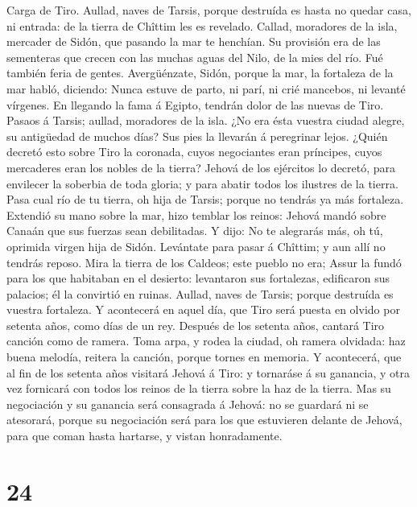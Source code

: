  Carga de Tiro. Aullad, naves de Tarsis, porque destruída
es hasta no quedar casa, ni entrada: de la tierra de Chîttim les es
revelado.  Callad, moradores de la isla, mercader de
Sidón, que pasando la mar te henchían.  Su provisión era
de las sementeras que crecen con las muchas aguas del Nilo, de la mies
del río. Fué también feria de gentes.  Avergüénzate,
Sidón, porque la mar, la fortaleza de la mar habló, diciendo: Nunca
estuve de parto, ni parí, ni crié mancebos, ni levanté vírgenes.
 En llegando la fama á Egipto, tendrán dolor de las nuevas
de Tiro.  Pasaos á Tarsis; aullad, moradores de la isla.
 ¿No era ésta vuestra ciudad alegre, su antigüedad de
muchos días? Sus pies la llevarán á peregrinar lejos. 
¿Quién decretó esto sobre Tiro la coronada, cuyos negociantes eran
príncipes, cuyos mercaderes eran los nobles de la tierra? 
Jehová de los ejércitos lo decretó, para envilecer la soberbia de toda
gloria; y para abatir todos los ilustres de la tierra. 
Pasa cual río de tu tierra, oh hija de Tarsis; porque no tendrás ya más
fortaleza.  Extendió su mano sobre la mar, hizo temblar
los reinos: Jehová mandó sobre Canaán que sus fuerzas sean debilitadas.
 Y dijo: No te alegrarás más, oh tú, oprimida virgen hija
de Sidón. Levántate para pasar á Chîttim; y aun allí no tendrás reposo.
 Mira la tierra de los Caldeos; este pueblo no era; Assur
la fundó para los que habitaban en el desierto: levantaron sus
fortalezas, edificaron sus palacios; él la convirtió en ruinas.
 Aullad, naves de Tarsis; porque destruída es vuestra
fortaleza.  Y acontecerá en aquel día, que Tiro será
puesta en olvido por setenta años, como días de un rey. Después de los
setenta años, cantará Tiro canción como de ramera.  Toma
arpa, y rodea la ciudad, oh ramera olvidada: haz buena melodía, reitera
la canción, porque tornes en memoria.  Y acontecerá, que
al fin de los setenta años visitará Jehová á Tiro: y tornaráse á su
ganancia, y otra vez fornicará con todos los reinos de la tierra sobre
la haz de la tierra.  Mas su negociación y su ganancia
será consagrada á Jehová: no se guardará ni se atesorará, porque su
negociación será para los que estuvieren delante de Jehová, para que
coman hasta hartarse, y vistan honradamente.

\hypertarget{section-23}{%
\section{24}\label{section-23}}

